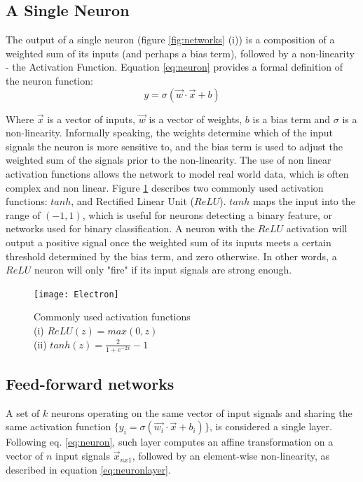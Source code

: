 \medskip

\subsection{A Single Neuron}

The output of a single neuron (figure \ref{fig:networks} (i)) is a composition of a weighted sum of its inputs (and perhaps a bias term), followed by a non-linearity - the Activation Function. Equation \ref{eq:neuron} provides a formal definition of the neuron function:
\begin{equation}
y = \sigma(\vec{w}\cdot\vec{x} + b)
\label{eq:neuron}
\end{equation}

Where \(\vec{x}\) is a vector of inputs, \(\vec{w}\) is a vector of weights, \(b\) is a bias term and \(\sigma\) is a non-linearity. Informally speaking, the weights determine which of the input signals the neuron is more sensitive to, and the bias term is used to adjust the weighted sum of the signals prior to the non-linearity. The use of non linear activation functions allows the network to model real world data, which is often complex and non linear. Figure \ref{fig:activations} describes two commonly used activation functions: $tanh$, and Rectified Linear Unit ($ReLU$). $tanh$ maps the input into the range of $(-1,1)$, which is useful for neurons detecting a binary feature, or networks used for binary classification. A neuron with the $ReLU$ activation will output a positive signal once the weighted sum of its inputs meets a certain threshold determined by the bias term, and zero otherwise. In other words, a $ReLU$ neuron will only "fire" if its input signals are strong enough. 

\begin{figure}
  \centering
    \texttt{[image: Electron]}
  \caption{
  Commonly used activation functions \\
  (i) $ ReLU(z) = max(0, z) $\\ 
  (ii) $ tanh(z) = \frac{2}{1 + e^{-2x}} - 1 $ \\
  }
  \label{fig:activations}
\end{figure}

\subsection{Feed-forward networks}

A set of \(k\) neurons operating on the same vector of input signals and sharing the same activation function \(\{y_i = \sigma(\vec{w_i}\cdot\vec{x} + b_i)\}\), is considered a single layer. Following eq. \ref{eq:neuron}, such layer computes an affine transformation on a vector of \(n\) input signals  \(\vec{x}_{nx1}\), followed by an element-wise non-linearity, as described in equation \ref{eq:neuronlayer}. 

